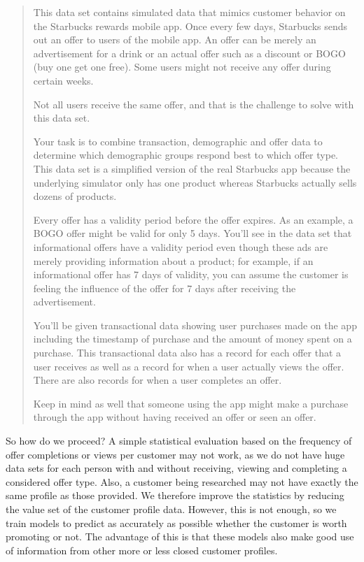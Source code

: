 \documentclass[11pt]{article} %
\begin{document}
\begin{quote}
\begin{em}
This data set contains simulated data that mimics customer behavior on the Starbucks rewards mobile app. Once every few days, Starbucks sends out an offer to users of the mobile app. An offer can be merely an advertisement for a drink or an actual offer such as a discount or BOGO (buy one get one free). Some users might not receive any offer during certain weeks. 

Not all users receive the same offer, and that is the challenge to solve with this data set.

Your task is to combine transaction, demographic and offer data to determine which demographic groups respond best to which offer type. This data set is a simplified version of the real Starbucks app because the underlying simulator only has one product whereas Starbucks actually sells dozens of products.

Every offer has a validity period before the offer expires. As an example, a BOGO offer might be valid for only 5 days. You'll see in the data set that informational offers have a validity period even though these ads are merely providing information about a product; for example, if an informational offer has 7 days of validity, you can assume the customer is feeling the influence of the offer for 7 days after receiving the advertisement.

You'll be given transactional data showing user purchases made on the app including the timestamp of purchase and the amount of money spent on a purchase. This transactional data also has a record for each offer that a user receives as well as a record for when a user actually views the offer. There are also records for when a user completes an offer. 

Keep in mind as well that someone using the app might make a purchase through the app without having received an offer or seen an offer.
\end{em}
\end{quote}

So how do we proceed?
A simple statistical evaluation based on the frequency of offer completions or views per customer may not work, as we do not have huge data sets for each person with and without receiving, viewing and completing a considered offer type. Also, a customer being researched may not have exactly the same profile as those provided.
We therefore improve the statistics by reducing the value set of the customer profile data.
However, this is not enough, so we train models to predict as accurately as possible whether the customer is worth promoting or not.
The advantage of this is that these models also make good use of information from other more or less closed customer profiles.
\end{document}

